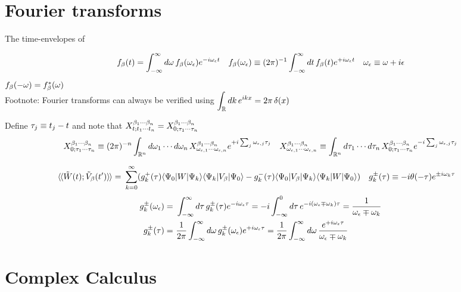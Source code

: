 \documentclass[11pt]{article}
\numberwithin{equation}{section}
\begin{document}
\newpage
\section{Fourier transforms}

\begin{rmk}
The time-envelopes of 
\end{rmk}

\begin{rmk}
\begin{align}
  f_\b(t)
=
  \int_{-\infty}^\infty
  d\w\,
  f_\b(\w_\ev)
  e^{-i\w_\ev t}
&&
  f_\b(\w_\ev)
\equiv
  (2\pi)^{-1}
  \int_{-\infty}^\infty
  dt\,
  f_\b(t)
  e^{+i\w_\ev t}
&&
  \w_\ev
\equiv
  \w
+
  i\ev
\end{align}
$
  f_{\beta }(-\omega )
=
  f_{\beta }^*(\omega )
$\\
Footnote:
Fourier transforms can always be verified using
$\ds{
  \int_\mb{R}
  dk\,
  e^{ikx}
=
  2\pi\,\d(x)
}$
\end{rmk}


\begin{rmk}
Define $\tau _j\equiv t_j-t$
and note that
$
  X^{\beta _1\cdots \beta _n}_{t;t_1\cdots t_n}
=
  X^{\beta _1\cdots \beta _n}_{0;\tau _1\cdots \tau _n}
$
\begin{align}
  X^{\b_1\cd \b_n}_{0;\ta_1\cd \ta_n}
\equiv
  (2\pi)^{-n}
  \int_{\mb{R}^n}
  d\w_1\cd d\w_n\,
  X^{\b_1\cd \b_n}_{\w_{\ev,1}\cd\w_{\ev,n}}
  e^{+i\sum_j\w_{\ev,j}\ta_j}
&&
  X^{\b_1\cd \b_n}_{\w_{\ev,1}\cd\w_{\ev,n}}
\equiv
  \int_{\mb{R}^n}
  d\ta_1\cd d\ta_n\,
  X^{\b_1\cd \b_n}_{0;\ta_1\cd \ta_n}
  e^{-i\sum_j\w_{\ev,j}\ta_j}
\end{align}
\end{rmk}

\begin{rmk}
\end{rmk}


\begin{align}
  {\ensuremath{{\langle}\hspace{-1pt}{\langle}}} \tilde{W}(t);\tilde{V}_{\beta }(t') {{\rangle}\hspace{-1pt}{\rangle}}
=&\
  \sum_{k=0}^\infty
  (
    g_k^+(\tau )
    \langle\Psi _0|W|\Psi _k\rangle
    \langle\Psi _k|V_{\beta }|\Psi _0\rangle
  -
    g_k^-(\tau )
    \langle\Psi _0|V_{\beta }|\Psi _k\rangle
    \langle\Psi _k|W|\Psi _0\rangle
  )
&&
  g_k^{\pm}(\tau )
\equiv
-
  i
  \theta (-\tau )
    e^{\pm i\omega _k \tau }
\end{align}
\begin{align}
  g_k^\pm(\w_\ev)
=&\
  \int_{-\infty}^\infty
  d\ta\,
  g_k^\pm(\ta)
  e^{-i\w_\ev \ta}
=
-
  i
  \int_{-\infty}^0
  d\ta\,
  e^{-i(\w_\ev \mp \w_k) \ta}
=
  \fr{
    1
  }{
    \w_\ev \mp \w_k
  }
\\
  g_k^{\pm}(\ta)
=&\
  \fr{1}{2\pi}
  \int_{-\infty}^{\infty}
  d\w\,
  g_k^\pm(\w_\ev)
  e^{+i\w_\ev \ta}
=
  \fr{1}{2\pi}
  \int_{-\infty}^{\infty}
  d\w\,
  \fr{
    e^{+i\w_\ev \ta}
  }{
    \w_\ev \mp \w_k
  }
\end{align}

\newpage
\section{Complex Calculus}
\end{document}
